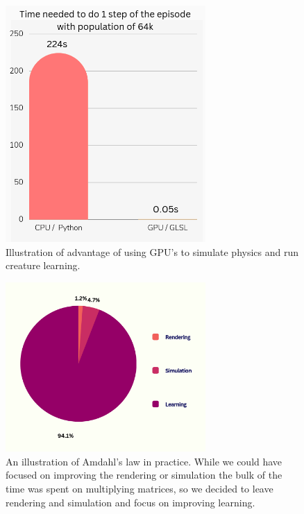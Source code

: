 \begin{itemize}
    \begin{figure}[hbt!]
        \includegraphics[width=3in]{time1step.png} %
        \caption{Illustration of advantage of using GPU's to simulate physics and run creature learning.}
        \label{fig:struktura} %
    \end{figure}

    \begin{figure}[hbt!]
        \includegraphics[width=3in]{resources/amdalh.png} %
        \caption{An illustration of Amdahl's law in practice. While we could have focused on improving the rendering or simulation the bulk of the time was spent on multiplying matrices, so we decided to leave rendering and simulation and focus on improving learning.}
        \label{fig:struktura} %
    \end{figure}
        
\end{itemize}

